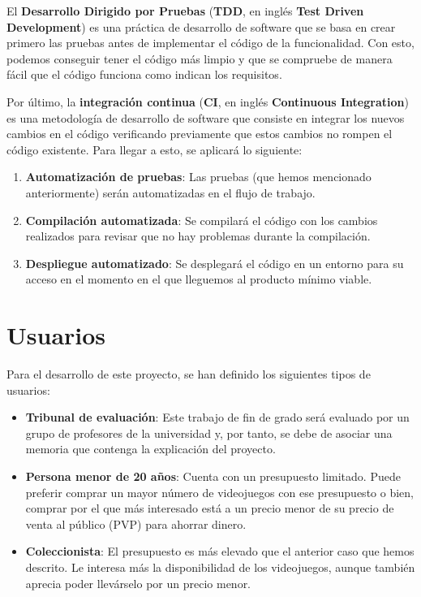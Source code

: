 El \textbf{Desarrollo Dirigido por Pruebas} (\textbf{TDD}, en inglés \textbf{Test 
Driven Development}) \cite{tdd} es una práctica de desarrollo de software que se 
basa en crear primero las pruebas antes de implementar el código de la 
funcionalidad. Con esto, podemos conseguir tener el código más limpio y que se 
compruebe de manera fácil que el código funciona como indican los requisitos.

Por último, la \textbf{integración continua} (\textbf{CI}, en inglés 
\textbf{Continuous Integration}) \cite{ci} es una metodología de desarrollo de 
software que consiste en integrar los nuevos cambios en el código verificando 
previamente que estos cambios no rompen el código existente. Para llegar a esto, se 
aplicará lo siguiente:

\begin{enumerate}
    \item \textbf{Automatización de pruebas}: Las pruebas (que hemos mencionado 
    anteriormente) serán automatizadas en el flujo de trabajo.
    \item \textbf{Compilación automatizada}: Se compilará el código con los cambios 
    realizados para revisar que no hay problemas durante la compilación.
    \item \textbf{Despliegue automatizado}: Se desplegará el código en un entorno 
    para su acceso en el momento en el que lleguemos al producto mínimo viable.
\end{enumerate}

\section{Usuarios}

Para el desarrollo de este proyecto, se han definido los siguientes tipos de 
usuarios:

\begin{itemize}
    \item \textbf{Tribunal de evaluación}: Este trabajo de fin de grado será 
    evaluado por un grupo de profesores de la universidad y, por tanto, se debe de 
    asociar una memoria que contenga la explicación del proyecto.
    \item \textbf{Persona menor de 20 años}: Cuenta con un presupuesto limitado. 
    Puede preferir comprar un mayor número de videojuegos con ese presupuesto o 
    bien, comprar por el que más interesado está a un precio menor de su precio de 
    venta al público (PVP) para ahorrar dinero.
    \item \textbf{Coleccionista}: El presupuesto es más elevado que el anterior 
    caso que hemos descrito. Le interesa más la disponibilidad de los videojuegos, 
    aunque también aprecia poder llevárselo por un precio menor.
\end{itemize}

